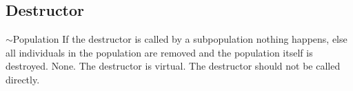 \subsection{Destructor}

\setNormalInstance
\printEmptyMethodReturnSpecial
{}
{$\sim$Population}
{If the destructor is called by a subpopulation 
 nothing happens, else all individuals in the population are
 removed and the population itself is destroyed.}
{None.}
{The destructor is virtual. The destructor should not
be called directly.}
